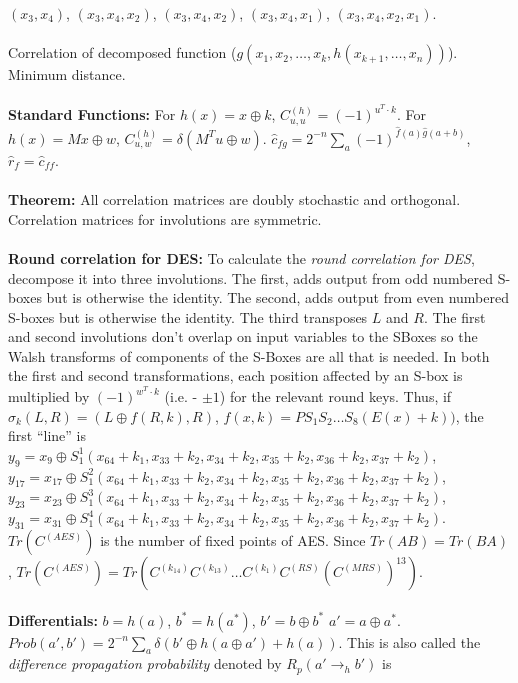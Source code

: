 $(x_3, x_4)$, $(x_3, x_4, x_2)$, $(x_3, x_4, x_2)$, 
$(x_3, x_4, x_1)$, $(x_3, x_4, x_2, x_1)$.
\\
\\
Correlation of decomposed function ($g(x_1 , x_2 , \ldots , x_{k}, h(x_{k+1}, \ldots, x_{n}))$).
Minimum distance.  \\
\\
{\bf Standard Functions:} For $h(x)= x \oplus k$, $C^{(h)}_{u,u}= (-1)^{u^T \cdot k}$.  For
$h(x)= Mx \oplus w$, $C^{(h)}_{u,w}= \delta(M^Tu \oplus w)$.
${\hat {c}}_{fg}= 2^{-n} \sum_a (-1)^{{\hat f}(a) {\hat g}(a+b)}$,
${\hat {r}}_f= {\hat {c}}_{ff}$.
\\
\\
{\bf Theorem:}
All correlation matrices are doubly stochastic and orthogonal.  Correlation matrices for
involutions are symmetric.
\\
\\
{\bf Round correlation for DES:}
To calculate the \emph{round correlation for DES}, 
decompose it into three involutions.  The first,
adds output from odd numbered S-boxes but is otherwise the identity.  The second,
adds output from even numbered S-boxes but is otherwise the identity.  The third transposes $L$
and $R$.  The first and second involutions don't overlap on input variables to the SBoxes so
the Walsh transforms of components of the S-Boxes are all that is needed.  In both the first
and second transformations, each position affected by an S-box is multiplied by
$(-1)^{w^T \cdot k}$ (i.e. - $\pm 1$) for the relevant round keys.
Thus, if $\sigma_k (L,R)= (L \oplus f(R,k), R)$, $f(x,k)= P S_1 S_2 \ldots S_8 (E(x)+k))$,
the first ``line'' is
$y_9= x_9 \oplus S_1^1(x_{64}+k_1,x_{33}+k_2,x_{34}+k_2, x_{35}+k_2, x_{36}+k_2, x_{37}+k_2)$,
$y_{17}= x_{17} \oplus S_1^2(x_{64}+k_1,x_{33}+k_2,x_{34}+k_2,x_{35}+k_2, x_{36}+k_2, x_{37}+k_2)$,
$y_{23}= x_{23} \oplus S_1^3(x_{64}+k_1,x_{33}+k_2,x_{34}+k_2,x_{35}+k_2, x_{36}+k_2, x_{37}+k_2)$,
$y_{31}= x_{31} \oplus S_1^4(x_{64}+k_1,x_{33}+k_2,x_{34}+k_2, x_{35}+k_2, x_{36}+k_2, x_{37}+k_2)$.
$Tr(C^{(AES)})$ is the number of fixed points of AES. Since $Tr(AB)=Tr(BA)$,
$Tr(C^{(AES)})= Tr( C^{(k_{14})} C^{(k_{13})} \ldots C^{(k_{1})} C^{(RS)} (C^{(MRS)})^{13})$.
\\
\\
{\bf Differentials:} 
$b= h(a)$,
$b^*= h(a^*)$, 
$b'= b \oplus b^*$
$a'= a \oplus a^*$. 
$Prob(a', b')= 2^{-n} \sum_a \delta(b' \oplus h(a\oplus a')+h(a))$.
This is also called the 
\emph{difference propagation probability} denoted by $R_p(a' \rightarrow_h b')$ is
